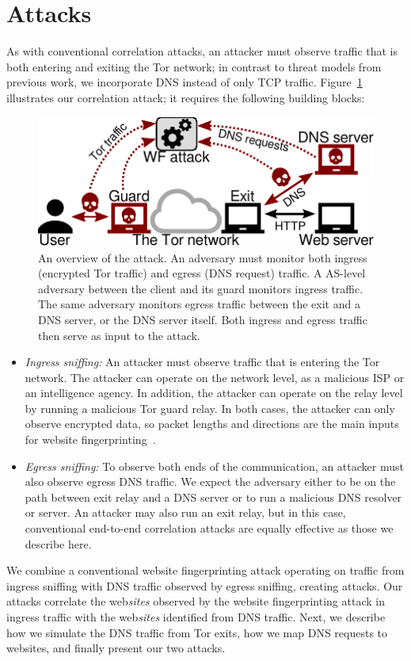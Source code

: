 \section{\name Attacks}
\label{sec:attack}

As with conventional correlation attacks, an attacker must observe
traffic that is both entering and exiting
the Tor network; in contrast to threat models from previous work, we
incorporate DNS instead of only
TCP traffic.
Figure~\ref{fig:attack-scenario} illustrates our correlation attack; it requires the
following building blocks:
\begin{figure}[t]
	\centering
	\includegraphics[width=0.8\linewidth]{figures/attack-scenario.pdf}
	\caption{An overview of the \name attack.  An adversary must monitor
		both ingress (encrypted Tor traffic) and egress (DNS request) traffic.
		A AS-level adversary between the
		client and its guard monitors ingress traffic.  The same adversary
		monitors egress traffic between the exit and a DNS server, or the DNS
		server itself.  Both ingress and egress traffic then serve as input to the
		\name attack.}
	\label{fig:attack-scenario}
\end{figure}

\begin{itemize}
    \item \emph{Ingress sniffing:} An attacker must observe traffic that is
		entering the Tor network.  The attacker can operate on the network level,
		as a malicious ISP or an intelligence agency.  In addition, the
		attacker can operate on the relay level by running a malicious Tor guard
		relay.  In both cases, the attacker can only observe encrypted
		data, so packet lengths and
		directions are the main inputs for website fingerprinting~\cite{Panchenko2016a}.
    \item \emph{Egress sniffing:} To observe both ends of the communication, an
		attacker must also observe egress DNS traffic.  We expect the adversary
		either to be on the path between exit relay
		and a DNS server or to run a malicious DNS
		resolver or server.  An attacker may also run an exit relay,
		but in this case, conventional end-to-end correlation
                attacks are equally effective as those we describe here.
\end{itemize}
We combine a conventional website fingerprinting attack operating on traffic
from ingress sniffing with
DNS traffic observed by egress sniffing, creating \name attacks. Our attacks
correlate the web\emph{sites} observed by the website fingerprinting attack in
ingress traffic with
the web\emph{sites} identified from DNS traffic. Next, we describe how we
simulate the DNS traffic from Tor exits, how we map DNS requests to websites,
and finally present our two \name attacks.

